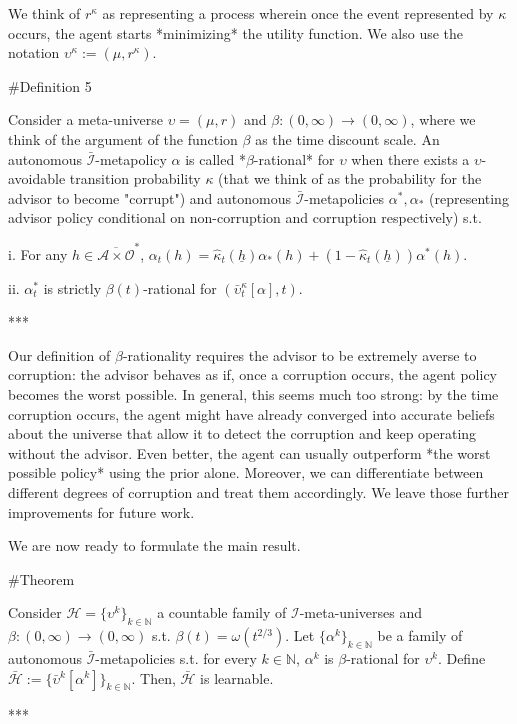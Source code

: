 \documentclass[a4paper]{article}
\newcommand{\Nats}{\mathbb{N}}
\newcommand{\Ob}{\mathcal{O}}
\newcommand{\A}{\mathcal{A}}
\newcommand{\I}{\mathcal{I}}
\newcommand{\Adi}{\bar{\I}}
\newcommand{\Adao}{\overline{\A \times \Ob}}
\newcommand{\Adfh}{\Adao^*}
\newcommand{\Hy}{\mathcal{H}}
\begin{document}
We think of $r^\kappa$ as representing a process wherein once the event represented by $\kappa$ occurs, the agent starts *minimizing* the utility function. We also use the notation $\upsilon^\kappa:=(\mu,r^\kappa)$.

\#Definition 5

Consider a meta-universe $\upsilon=(\mu,r)$ and $\beta: (0,\infty) \rightarrow (0,\infty)$, where we think of the argument of the function $\beta$ as the time discount scale. An autonomous $\Adi$-metapolicy $\alpha$ is called *$\beta$-rational* for $\upsilon$ when there exists a $\upsilon$-avoidable transition probability $\kappa$ (that we think of as the probability for the advisor to become "corrupt") and autonomous $\Adi$-metapolicies $\alpha^*,\alpha_*$ (representing advisor policy conditional on non-corruption and corruption respectively) s.t. 

i. For any $h \in \Adfh$, $\alpha_t(h) = \hat{\kappa}_t(\underline{h}) \alpha_*(h) + (1 - \hat{\kappa}_t(\underline{h}))\alpha^*(h)$.

ii. $\alpha^*_t$ is strictly $\beta(t)$-rational for $(\bar{\upsilon}^\kappa_t[\alpha], t)$.

***

Our definition of $\beta$-rationality requires the advisor to be extremely averse to corruption: the advisor behaves as if, once a corruption occurs, the agent policy becomes the worst possible. In general, this seems much too strong: by the time corruption occurs, the agent might have already converged into accurate beliefs about the universe that allow it to detect the corruption and keep operating without the advisor. Even better, the agent can usually outperform *the worst possible policy* using the prior alone. Moreover, we can differentiate between different degrees of corruption and treat them accordingly. We leave those further improvements for future work.

We are now ready to formulate the main result.

\#Theorem

Consider $\Hy = \{\upsilon^k\}_{k \in \Nats}$ a countable family of $\I$-meta-universes and $\beta: (0,\infty) \rightarrow (0,\infty)$ s.t. $\beta(t) = \omega(t^{2/3})$. Let $\{\alpha^k\}_{k \in \Nats}$ be a family of autonomous $\Adi$-metapolicies s.t. for every $k \in \Nats$, $\alpha^k$ is $\beta$-rational for $\upsilon^k$. Define $\bar{\Hy}:=\{\bar{\upsilon}^k[\alpha^k]\}_{k \in \Nats}$. Then, $\bar{\Hy}$ is learnable.

***
\end{document}
